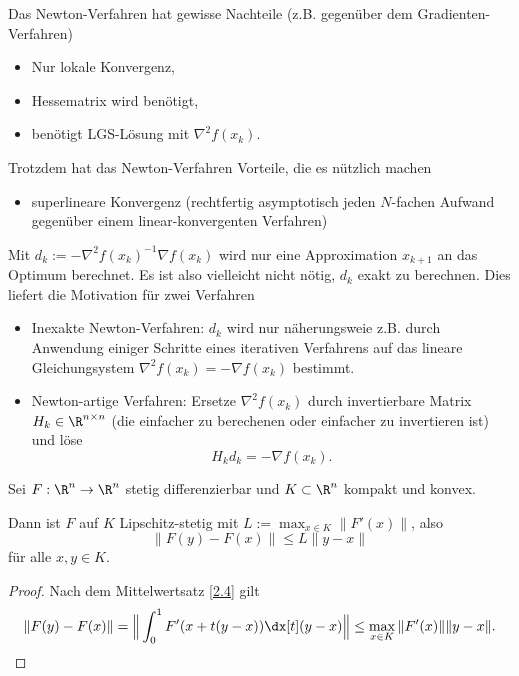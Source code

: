 Das Newton-Verfahren hat gewisse Nachteile (z.B. gegenüber dem Gradienten-Verfahren)
\begin{itemize}
	\item
		Nur lokale Konvergenz,
	\item
		Hessematrix wird benötigt,
	\item
		benötigt LGS-Lösung mit $\nabla^2 f(x_k)$.
\end{itemize}
Trotzdem hat das Newton-Verfahren Vorteile, die es nützlich machen
\begin{itemize}
	\item
		superlineare Konvergenz (rechtfertig asymptotisch jeden $N$-fachen Aufwand gegenüber einem linear-konvergenten Verfahren)
\end{itemize}
Mit $d_k := - \nabla^2 f(x_k)^{-1} \nabla f(x_k)$ wird nur eine Approximation $x_{k+1}$ an das Optimum berechnet.
Es ist also vielleicht nicht nötig, $d_k$ exakt zu berechnen.
Dies liefert die Motivation für zwei Verfahren
\begin{itemize}
	\item
		Inexakte Newton-Verfahren:
		$d_k$ wird nur näherungsweie z.B. durch Anwendung einiger Schritte eines iterativen Verfahrens auf das lineare Gleichungsystem $\nabla^2 f(x_k) = - \nabla f(x_k)$ bestimmt.
	\item
		Newton-artige Verfahren:
		Ersetze $\nabla^2 f(x_k)$ durch invertierbare Matrix $H_k \in \R^{n\times n}$ (die einfacher zu berechenen oder einfacher zu invertieren ist) und löse
		\[
			H_k d_k = - \nabla f(x_k).
		\]
\end{itemize}

\begin{lem} \label{2.51}
	Sei $F: \R^n \to \R^n$ stetig differenzierbar und $K \subset \R^n$ kompakt und konvex.

	Dann ist $F$ auf $K$ Lipschitz-stetig mit $L := \max_{x\in K} \|F'(x)\|$, also
	\[
		\|F(y) - F(x)\|
		\le L \|y-x\|
	\]
	für alle $x,y \in K$.
	\begin{proof}
		Nach dem Mittelwertsatz \ref{2.4} gilt
		\[
			\|F(y) - F(x)\| = \Big\| \int_0^1 F'(x + t(y-x)) \dx[t] (y-x) \Big\|
			\le \max_{x\in K} \|F'(x)\| \|y-x\|.
		\]
	\end{proof}
\end{lem}


